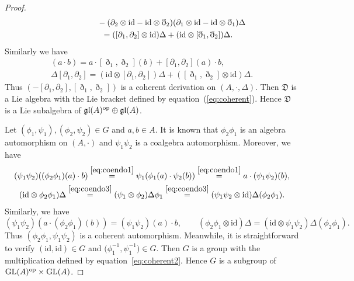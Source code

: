 \documentclass[pdftex]{sigma}
\numberwithin{equation}{section}
\newcommand{\id}{\mathrm{id}}
\begin{document}
\begin{proof}
\begin{gather*}
\hphantom{\Delta [\partial_1,\partial_2]=}{}
 - (\partial_2 \otimes \id - \id \otimes \eth_2)(\partial_1 \otimes \id - \id \otimes \eth_1)\Delta \\
 \hphantom{\Delta [\partial_1,\partial_2]}{}
= ([\partial_1,\partial_2] \otimes \id) \Delta + (\id \otimes [\eth_1,\eth_2])\Delta.
\end{gather*}
Similarly we have
\begin{gather*}
 [\eth_1,\eth_2](a \cdot b) = a \cdot [\eth_1,\eth_2](b) + [\partial_1,\partial_2](a) \cdot b, \\
 \Delta [\partial_1, \partial_2] = (\id \otimes [\partial_1, \partial_2])\Delta + ([\eth_1,\eth_2] \otimes \id )\Delta.
\end{gather*}
Thus $(-[\partial_1,\partial_2], [\eth_1,\eth_2])$ is a coherent derivation on $(A, \cdot, \Delta)$.
Then $\mathfrak{D}$ is a Lie algebra with the Lie bracket defined by equation~(\ref{eq:coherent}).
Hence $\mathfrak{D}$ is a Lie subalgebra of $\mathfrak{gl}(A)^{\rm op} \oplus \mathfrak{gl}(A)$.

Let $(\phi_1, \psi_1), (\phi_2,\psi_2) \in G$ and $a, b \in A$.
It is known that $\phi_2 \phi_1$ is an algebra automorphism on $(A, \cdot)$ and $\psi_1 \psi_2$ is a coalgebra automorphism. Moreover, we have
\begin{gather*}
 (\psi_1 \psi_2)((\phi_2 \phi_1)(a) \cdot b) \overset{\eqref{eq:coendo1}}{=} \psi_1(\phi_1(a) \cdot \psi_2(b)) \overset{\eqref{eq:coendo1}}{=} a \cdot (\psi_1\psi_2)(b), \\
 (\id \otimes \phi_2 \phi_1)\Delta \overset{\eqref{eq:coendo3}}{=} (\psi_1 \otimes \phi_2)\Delta \phi_1 \overset{\eqref{eq:coendo3}}{=} (\psi_1 \psi_2 \otimes \id)\Delta(\phi_2 \phi_1).
\end{gather*}
Similarly, we have
\begin{equation*}
 (\psi_1 \psi_2)(a \cdot (\phi_2 \phi_1)(b) ) = (\psi_1\psi_2)(a) \cdot b, \qquad (\phi_2 \phi_1 \otimes \id)\Delta = (\id \otimes \psi_1 \psi_2)\Delta(\phi_2 \phi_1).
\end{equation*}
Thus $(\phi_2 \phi_1, \psi_1 \psi_2)$ is a coherent automorphism.
Meanwhile, it is straightforward to verify $(\id, \id) \in G$ and $\big(\phi_1^{-1}, \psi_1^{-1}\big) \in G$.
Then $G$ is a group with the multiplication defined by equation~\eqref{eq:coherent2}.
Hence $G$ is a subgroup of ${\rm GL}(A)^{\rm op} \times {\rm GL}(A)$.


\end{proof}
\end{document}

